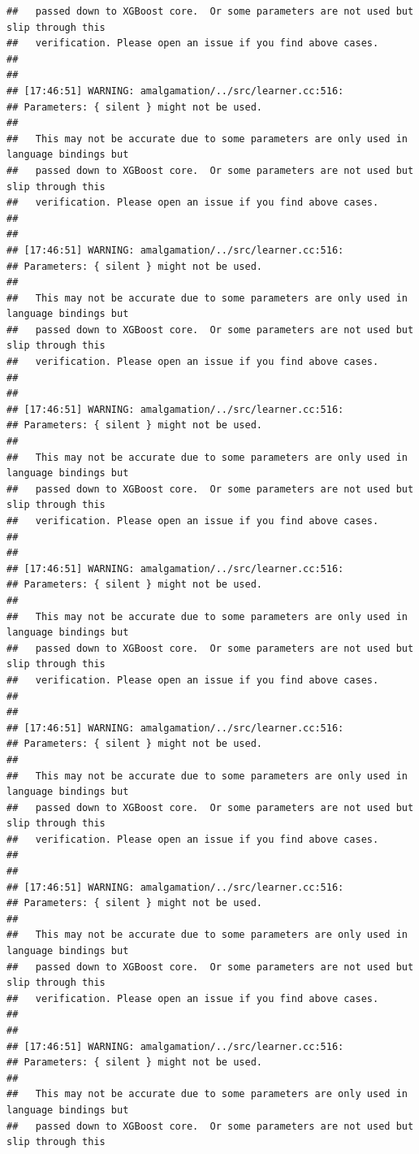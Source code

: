 \documentclass[AMS,STIX2COL]{WileyNJD-v2}\usepackage[]{graphicx}\usepackage[]{color}
\makeatletter
\newenvironment{kframe}{%
 \def\at@end@of@kframe{}%
 \ifinner\ifhmode%
  \def\at@end@of@kframe{\end{minipage}}%
  \begin{minipage}{\columnwidth}%
 \fi\fi%
 \def\FrameCommand##1{\hskip\@totalleftmargin \hskip-\fboxsep
 \colorbox{shadecolor}{##1}\hskip-\fboxsep
     \hskip-\linewidth \hskip-\@totalleftmargin \hskip\columnwidth}%
 \MakeFramed {\advance\hsize-\width
   \@totalleftmargin\z@ \linewidth\hsize
   \@setminipage}}%
 {\par\unskip\endMakeFramed%
 \at@end@of@kframe}
\newenvironment{knitrout}{}{} %
\makeatother
\begin{document}
\begin{knitrout}
\begin{kframe}
\begin{verbatim}
##   passed down to XGBoost core.  Or some parameters are not used but slip through this
##   verification. Please open an issue if you find above cases.
## 
## 
## [17:46:51] WARNING: amalgamation/../src/learner.cc:516: 
## Parameters: { silent } might not be used.
## 
##   This may not be accurate due to some parameters are only used in language bindings but
##   passed down to XGBoost core.  Or some parameters are not used but slip through this
##   verification. Please open an issue if you find above cases.
## 
## 
## [17:46:51] WARNING: amalgamation/../src/learner.cc:516: 
## Parameters: { silent } might not be used.
## 
##   This may not be accurate due to some parameters are only used in language bindings but
##   passed down to XGBoost core.  Or some parameters are not used but slip through this
##   verification. Please open an issue if you find above cases.
## 
## 
## [17:46:51] WARNING: amalgamation/../src/learner.cc:516: 
## Parameters: { silent } might not be used.
## 
##   This may not be accurate due to some parameters are only used in language bindings but
##   passed down to XGBoost core.  Or some parameters are not used but slip through this
##   verification. Please open an issue if you find above cases.
## 
## 
## [17:46:51] WARNING: amalgamation/../src/learner.cc:516: 
## Parameters: { silent } might not be used.
## 
##   This may not be accurate due to some parameters are only used in language bindings but
##   passed down to XGBoost core.  Or some parameters are not used but slip through this
##   verification. Please open an issue if you find above cases.
## 
## 
## [17:46:51] WARNING: amalgamation/../src/learner.cc:516: 
## Parameters: { silent } might not be used.
## 
##   This may not be accurate due to some parameters are only used in language bindings but
##   passed down to XGBoost core.  Or some parameters are not used but slip through this
##   verification. Please open an issue if you find above cases.
## 
## 
## [17:46:51] WARNING: amalgamation/../src/learner.cc:516: 
## Parameters: { silent } might not be used.
## 
##   This may not be accurate due to some parameters are only used in language bindings but
##   passed down to XGBoost core.  Or some parameters are not used but slip through this
##   verification. Please open an issue if you find above cases.
## 
## 
## [17:46:51] WARNING: amalgamation/../src/learner.cc:516: 
## Parameters: { silent } might not be used.
## 
##   This may not be accurate due to some parameters are only used in language bindings but
##   passed down to XGBoost core.  Or some parameters are not used but slip through this

\end{verbatim}
\end{kframe}
\end{knitrout}
\end{document}
